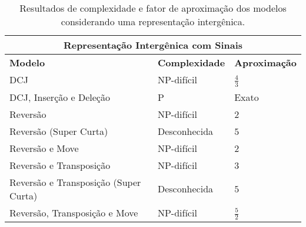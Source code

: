 \begin{table}[!htb]
  \caption{Resultados de complexidade e fator de aproximação dos modelos considerando uma representação intergênica.}
  \label{table:GNCKDPJY}
  \centering
  \begin{tabular}{|p{8cm}|p{3cm}|p{3cm}|}
    \hline
    \multicolumn{3}{|c|}{{\bf Representação Intergênica com Sinais}}                                                                             \\ \hline
    {\bf Modelo}                            & {\bf Complexidade}                                 & {\bf Aproximação}                             \\ \hline
    DCJ                                     & NP-difícil~\cite{2017-fertin-etal}           & $\frac{4}{3}$~\cite{2017-fertin-etal}               \\ \hline
    DCJ, Inserção e Deleção                 & P~\cite{2016b-bulteau-etal}                  & Exato~\cite{2016b-bulteau-etal}                     \\ \hline
    Reversão                                & NP-difícil~\cite{2021b-oliveira-etal}        & $2$~\cite{2021b-oliveira-etal}                      \\ \hline
    Reversão (Super Curta)                  & Desconhecida                                 & $5$~\cite{2019c-oliveira-etal}                      \\ \hline
    Reversão e Move                         & NP-difícil~\cite{2022b-brito-etal}           & $2$~\cite{2022b-brito-etal}                         \\ \hline
    Reversão e Transposição                 & NP-difícil~\cite{2021a-oliveira-etal}        & $3$~\cite{2021b-oliveira-etal}                      \\ \hline
    Reversão e Transposição (Super Curta)   & Desconhecida                                 & $5$~\cite{2019c-oliveira-etal}                      \\ \hline
    Reversão, Transposição e Move           & NP-difícil~\cite{2021a-oliveira-etal}        & $\frac{5}{2}$~\cite{2021a-oliveira-etal}            \\ \hline
  \end{tabular}

  \hfill \break


\end{table}
